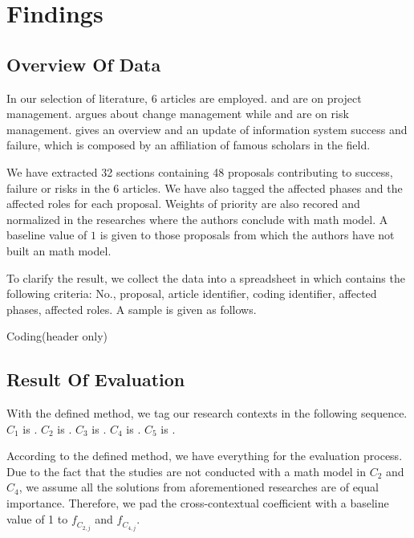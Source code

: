 
\section{Findings}

\subsection{Overview Of Data}
In our selection of literature, 6 articles are employed.  and  are on project management.  argues about change management while  and  are on risk management.  gives an overview and an update of information system success and failure, which is composed by an affiliation of famous scholars in the field.

We have extracted 32 sections containing 48 proposals contributing to success, failure or risks in the 6 articles. We have also tagged the affected phases and the affected roles for each proposal. Weights of priority are also recored and normalized in the researches where the authors conclude with math model. A baseline value of $1$ is given to those proposals from which the authors have not built an math model.

To clarify the result, we collect the data into a spreadsheet in which contains the following criteria: No., proposal, article identifier, coding identifier, affected phases, affected roles. A sample is given as follows.
\begin{table}[ht]
\caption{Coding(header only)}
\label{tab:sample}
\end{table}

\subsection{Result Of Evaluation}
With the defined method, we tag our research contexts in the following sequence.
$C_{1}$ is .
$C_{2}$ is .
$C_{3}$ is .
$C_{4}$ is .
$C_{5}$ is .

According to the defined method, we have everything for the evaluation process. Due to the fact that the studies are not conducted with a math model in $C_{2}$ and $C_{4}$, we assume all the solutions from aforementioned researches are of equal importance. Therefore, we pad the cross-contextual coefficient with a baseline value of 1 to $\mathit{f_{C_{2,j}}}$ and $\mathit{f_{C_{4,j}}}$.

